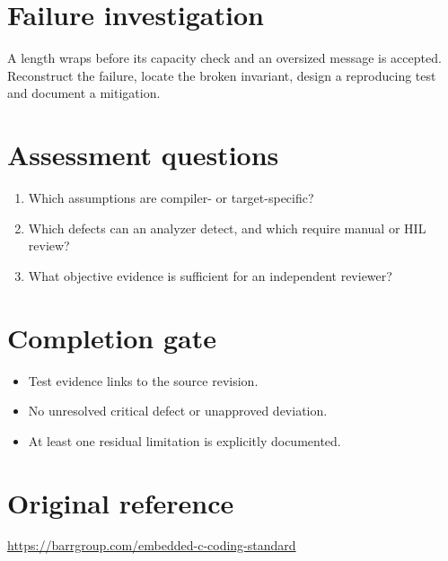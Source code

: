 \documentclass[10pt,letterpaper]{article}
\begin{document}
\section{Failure investigation}
A length wraps before its capacity check and an oversized message is accepted. Reconstruct the failure, locate the broken invariant, design a reproducing test and document a mitigation.
\section{Assessment questions}
\begin{enumerate}
\item Which assumptions are compiler- or target-specific?
\item Which defects can an analyzer detect, and which require manual or HIL review?
\item What objective evidence is sufficient for an independent reviewer?
\end{enumerate}

\section{Completion gate}
\begin{itemize}
\item Test evidence links to the source revision.
\item No unresolved critical defect or unapproved deviation.
\item At least one residual limitation is explicitly documented.
\end{itemize}

\section{Original reference}
\url{https://barrgroup.com/embedded-c-coding-standard}
\end{document}
